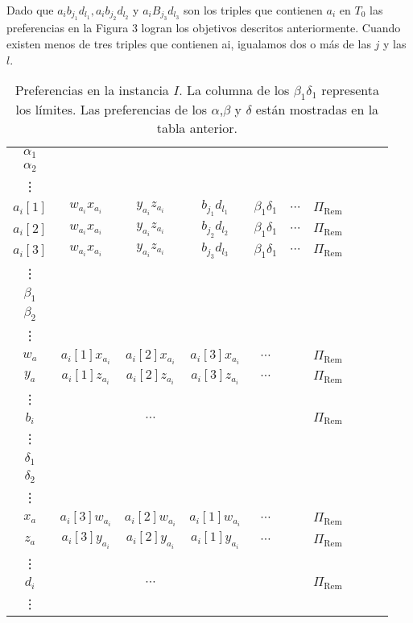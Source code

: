 \documentclass{article}
\begin{document}
Dado que $a_ib_{j_1}d_{l_1},a_ib_{j_2}d_{l_2}$ y $a_iB_{j_3}d_{l_3}$ son los triples que contienen $a_i$ en $T_0$
las preferencias en la Figura 3 logran los objetivos descritos anteriormente. Cuando existen menos de tres triples que contienen ai, igualamos dos o más
de las $j$ y las $l$.


\begin{table}[h!]
    \centering
   
    \begin{tabular}{c|ccccccccc}
        $\alpha_1$ & & & & & & & & & \\
        $\alpha_2$ & & & & & & & & & \\
        \vdots     & & & & & & & & & \\
        $a_i[1]$   & $w_{a_i} x_{a_i}$ & $y_{a_i} z_{a_i}$ & $b_{j_1} d_{l_1}$ & $\beta_1 \delta_1$ & $\cdots$ & $\Pi_{\text{Rem}}$ \\
        $a_i[2]$   & $w_{a_i} x_{a_i}$ & $y_{a_i} z_{a_i}$ & $b_{j_2} d_{l_2}$ & $\beta_1 \delta_1$ & $\cdots$ & $\Pi_{\text{Rem}}$ \\
        $a_i[3]$   & $w_{a_i} x_{a_i}$ & $y_{a_i} z_{a_i}$ & $b_{j_3} d_{l_3}$ & $\beta_1 \delta_1$ & $\cdots$ & $\Pi_{\text{Rem}}$ \\
        \vdots     & & & & & & & & & \\
        \hline
        $\beta_1$  & & & & & & & & & \\
        $\beta_2$  & & & & & & & & & \\
        \vdots\\
        $w_a$      & $a_i[1] x_{a_i}$ & $a_i[2] x_{a_i}$ & $a_i[3] x_{a_i}$ & $\cdots$ & & $\Pi_{\text{Rem}}$ \\
        $y_a$      & $a_i[1] z_{a_i}$ & $a_i[2] z_{a_i}$ & $a_i[3] z_{a_i}$ & $\cdots$ & & $\Pi_{\text{Rem}}$ \\
        \vdots     & & & & & & & & & \\
        $b_i$      & & $\cdots$ & & & & $\Pi_{\text{Rem}}$ \\
        \vdots\\
        \hline
        $\delta_1$ & & & & & & & & & \\
        $\delta_2$ & & & & & & & & & \\
        \vdots \\
        $x_a$      & $a_i[3] w_{a_i}$ & $a_i[2] w_{a_i}$ & $a_i[1] w_{a_i}$ & $\cdots$ & & $\Pi_{\text{Rem}}$ \\
        $z_a$      & $a_i[3] y_{a_i}$ & $a_i[2] y_{a_i}$ & $a_i[1] y_{a_i}$ & $\cdots$ & & $\Pi_{\text{Rem}}$ \\
        \vdots     & & & & & & & & & \\
        $d_i$      & & $\cdots$ & & & & $\Pi_{\text{Rem}}$ \\
        \vdots     & & & & & & & & & \\
    \end{tabular}
    \caption{Preferencias en la instancia $I$. La columna de los $\beta_1 \delta_1$ representa los límites. Las preferencias de los $\alpha$,$\beta$ y $\delta$ están mostradas en la tabla anterior. }  
\end{table}
\end{document}
